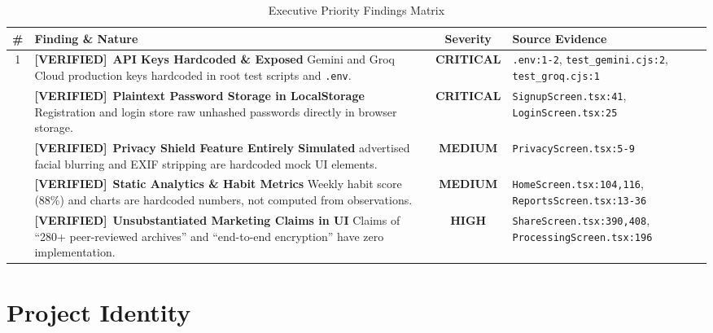 \documentclass[10pt,a4paper]{report}
\newcommand{\verified}{\colorbox{green!15}{\textcolor{passGreen}{\bfseries\scriptsize [VERIFIED]}}}
\newcommand{\badgeCrit}{\colorbox{red!20}{\textcolor{critRed}{\bfseries\scriptsize CRITICAL}}}
\newcommand{\badgeHigh}{\colorbox{orange!20}{\textcolor{critRed!80!orange}{\bfseries\scriptsize HIGH}}}
\newcommand{\badgeMed}{\colorbox{yellow!30}{\textcolor{warnOrange!80!black}{\bfseries\scriptsize MEDIUM}}}
\begin{document}
\begin{table}[htbp]
\centering
\small
\caption{Executive Priority Findings Matrix}
\begin{tabularx}{\textwidth}{c p{5.5cm} c p{4cm}}
\toprule
\textbf{\#} & \textbf{Finding \& Nature} & \textbf{Severity} & \textbf{Source Evidence} \\
\midrule
1 & \verified\ \textbf{API Keys Hardcoded \& Exposed} \newline Gemini and Groq Cloud production keys hardcoded in root test scripts and \texttt{.env}. & \badgeCrit & \texttt{.env:1-2}, \newline \texttt{test\_gemini.cjs:2}, \newline \texttt{test\_groq.cjs:1} \\
\addlinespace
2 & \verified\ \textbf{Plaintext Password Storage in LocalStorage} \newline Registration and login store raw unhashed passwords directly in browser storage. & \badgeCrit & \texttt{SignupScreen.tsx:41}, \newline \texttt{LoginScreen.tsx:25} \\
\addlinespace
3 & \verified\ \textbf{Privacy Shield Feature Entirely Simulated} \newline advertised facial blurring and EXIF stripping are hardcoded mock UI elements. & \badgeMed & \texttt{PrivacyScreen.tsx:5-9} \\
\addlinespace
4 & \verified\ \textbf{Static Analytics \& Habit Metrics} \newline Weekly habit score (88\%) and charts are hardcoded numbers, not computed from observations. & \badgeMed & \texttt{HomeScreen.tsx:104,116}, \newline \texttt{ReportsScreen.tsx:13-36} \\
\addlinespace
5 & \verified\ \textbf{Unsubstantiated Marketing Claims in UI} \newline Claims of ``280+ peer-reviewed archives'' and ``end-to-end encryption'' have zero implementation. & \badgeHigh & \texttt{ShareScreen.tsx:390,408}, \newline \texttt{ProcessingScreen.tsx:196} \\
\bottomrule
\end{tabularx}
\end{table}

\chapter{Project Identity}
\end{document}
